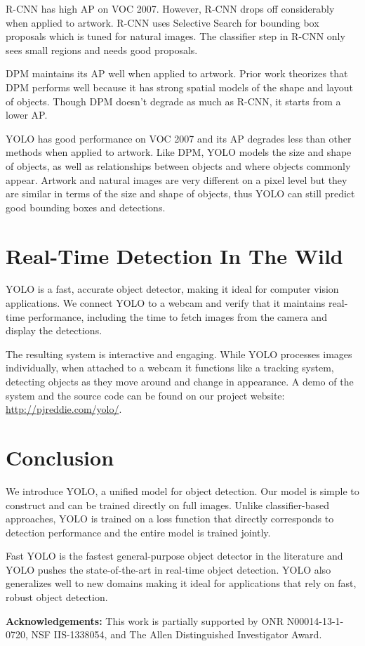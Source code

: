 \documentclass[10pt,twocolumn,letterpaper]{article}
\begin{document}
R-CNN has high AP on VOC 2007. However, R-CNN drops off considerably when applied to artwork. R-CNN uses Selective Search for bounding box proposals which is tuned for natural images. The classifier step in R-CNN only sees small regions and needs good proposals.

DPM maintains its AP well when applied to artwork. Prior work theorizes that DPM performs well because it has strong spatial models of the shape and layout of objects. Though DPM doesn't degrade as much as R-CNN, it starts from a lower AP.

YOLO has good performance on VOC 2007 and its AP degrades less than other methods when applied to artwork. Like DPM, YOLO models the size and shape
of objects, as well as relationships between objects and where objects commonly appear. Artwork and natural images are very different on a pixel level but they are similar in terms of the size and shape of objects, thus YOLO can still predict good bounding boxes and detections.

\section{Real-Time Detection In The Wild}

YOLO is a fast, accurate object detector, making it ideal for computer vision applications. We connect YOLO to a webcam and verify that it maintains real-time performance, including the time to fetch images from the camera and display the detections.

The resulting system is interactive and engaging. While YOLO processes images individually, when attached to a webcam it functions like a tracking system, detecting objects as they move around and change in appearance. A demo of the system and the source code can be found on our project website: \url{http://pjreddie.com/yolo/}.



\section{Conclusion}

We introduce YOLO, a unified model for object detection. Our model is simple to construct and can be trained directly on full images. Unlike classifier-based approaches, YOLO is trained on a loss function that directly corresponds to detection performance and the entire model is trained jointly.

Fast YOLO is the fastest general-purpose object detector in the literature and YOLO pushes the state-of-the-art in real-time object detection. YOLO also generalizes well to new domains making it ideal for applications that rely on fast, robust object detection.

\noindent\textbf{Acknowledgements:} This work is partially supported by ONR N00014-13-1-0720, NSF IIS-1338054, and The Allen Distinguished Investigator Award.







\pagebreak
{\small


}
\end{document}
